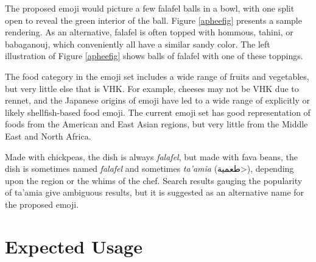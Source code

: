\documentclass[a4paper,10pt]{article}
\begin{document}
The proposed emoji would picture a few falafel balls in a bowl, with one
split open to reveal the green interior of the ball. Figure \ref{apheefig} presents
a sample rendering. As an alternative, falafel is often topped with hommous, tahini,
or babaganouj, which conveniently all have a similar sandy color. The left illustration
of Figure \ref{apheefig} shows balls of falafel with one of these toppings.

The food category in the emoji set includes a wide range of fruits and vegetables, but
very little else that is VHK. For example, cheeses may not be VHK due to rennet, and the
Japanese origins of emoji have led to a wide range of explicitly or likely
shellfish-based food emoji. The current emoji set has good representation of foods
from the American and East Asian regions, but very little from the Middle East and
North Africa.


Made with chickpeas, the dish is always {\em falafel}, but made with fava beans, the dish
is sometimes named {\em falafel} and sometimes {\em ta'amia} (\<طعمية>), depending upon the
region or the whims of the chef. Search results gauging the popularity of {\sc ta'amia} give
ambiguous results, but it is suggested as an alternative name for the proposed emoji.

\section{Expected Usage}
\end{document}
